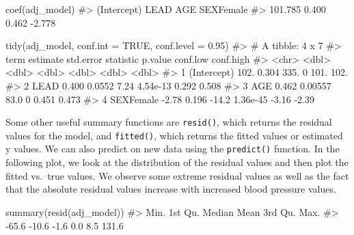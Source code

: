 \documentclass[
  letterpaper,
]{latex/krantz}
\makeatletter
\newenvironment{Shaded}{\begin{snugshade}}{\end{snugshade}}
\newcommand{\AttributeTok}[1]{\textcolor[rgb]{0.40,0.45,0.13}{#1}}
\newcommand{\CommentTok}[1]{\textcolor[rgb]{0.37,0.37,0.37}{#1}}
\newcommand{\ConstantTok}[1]{\textcolor[rgb]{0.56,0.35,0.01}{#1}}
\newcommand{\FloatTok}[1]{\textcolor[rgb]{0.68,0.00,0.00}{#1}}
\newcommand{\FunctionTok}[1]{\textcolor[rgb]{0.28,0.35,0.67}{#1}}
\newcommand{\NormalTok}[1]{\textcolor[rgb]{0.00,0.23,0.31}{#1}}
\newenvironment{kframe}{%
\medskip{}
\setlength{\fboxsep}{.8em}
 \def\at@end@of@kframe{}%
 \ifinner\ifhmode%
  \def\at@end@of@kframe{\end{minipage}}%
  \begin{minipage}{\columnwidth}%
 \fi\fi%
 \def\FrameCommand##1{\hskip\@totalleftmargin \hskip-\fboxsep
 \colorbox{shadecolor}{##1}\hskip-\fboxsep
     \hskip-\linewidth \hskip-\@totalleftmargin \hskip\columnwidth}%
 \MakeFramed {\advance\hsize-\width
   \@totalleftmargin\z@ \linewidth\hsize
   \@setminipage}}%
 {\par\unskip\endMakeFramed%
 \at@end@of@kframe}
\renewenvironment{Shaded}{\begin{kframe}}{\end{kframe}}
\makeatother
\begin{document}
\begin{Shaded}
\begin{Highlighting}[]
\FunctionTok{coef}\NormalTok{(adj\_model)}
\CommentTok{\#\textgreater{} (Intercept)        LEAD         AGE   SEXFemale }
\CommentTok{\#\textgreater{}     101.785       0.400       0.462      {-}2.778}
\end{Highlighting}
\end{Shaded}

\begin{Shaded}
\begin{Highlighting}[]
\FunctionTok{tidy}\NormalTok{(adj\_model, }\AttributeTok{conf.int =} \ConstantTok{TRUE}\NormalTok{, }\AttributeTok{conf.level =} \FloatTok{0.95}\NormalTok{)}
\CommentTok{\#\textgreater{} \# A tibble: 4 x 7}
\CommentTok{\#\textgreater{}   term        estimate std.error statistic  p.value conf.low conf.high}
\CommentTok{\#\textgreater{}   \textless{}chr\textgreater{}          \textless{}dbl\textgreater{}     \textless{}dbl\textgreater{}     \textless{}dbl\textgreater{}    \textless{}dbl\textgreater{}    \textless{}dbl\textgreater{}     \textless{}dbl\textgreater{}}
\CommentTok{\#\textgreater{} 1 (Intercept)  102.      0.304      335.   0         101.      102.   }
\CommentTok{\#\textgreater{} 2 LEAD           0.400   0.0552       7.24 4.54e{-}13    0.292     0.508}
\CommentTok{\#\textgreater{} 3 AGE            0.462   0.00557     83.0  0           0.451     0.473}
\CommentTok{\#\textgreater{} 4 SEXFemale     {-}2.78    0.196      {-}14.2  1.36e{-}45   {-}3.16     {-}2.39}
\end{Highlighting}
\end{Shaded}

Some other useful summary functions are
\texttt{resid()}, which
returns the residual values for the model, and
\texttt{fitted()}, which
returns the fitted values or estimated y values. We can also predict on
new data using the
\texttt{predict()}
function. In the following plot, we look at the distribution of the
residual values and then plot the fitted vs.~true values. We observe
some extreme residual values as well as the fact that the absolute
residual values increase with increased blood pressure values.

\begin{Shaded}
\begin{Highlighting}[]
\FunctionTok{summary}\NormalTok{(}\FunctionTok{resid}\NormalTok{(adj\_model))}
\CommentTok{\#\textgreater{}    Min. 1st Qu.  Median    Mean 3rd Qu.    Max. }
\CommentTok{\#\textgreater{}   {-}65.6   {-}10.6    {-}1.6     0.0     8.5   131.6}
\end{Highlighting}
\end{Shaded}
\end{document}
